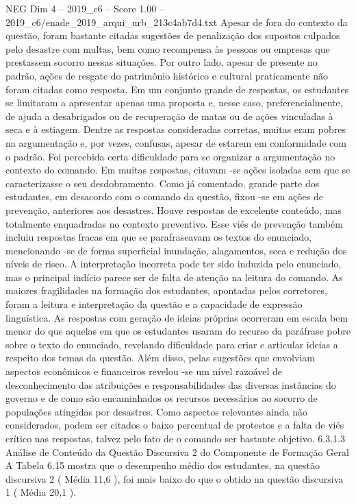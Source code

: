 \begin{textsample}{NEG Dim 4 – 2019\_c6 – Score 1.00 – 2019\_c6/enade\_2019\_arqui\_urb\_213c4ab7d4.txt}
Apesar de fora do contexto da questão, foram bastante citadas sugestões de penalização dos supostos culpados pelo desastre com multas, bem como recompensa às pessoas ou empresas que prestassem socorro nessas situações.
Por outro lado, apesar de presente no padrão, ações de resgate do patrimônio histórico e cultural praticamente não foram citadas como resposta.
Em um conjunto grande de respostas, os estudantes se limitaram a apresentar apenas uma proposta e, nesse caso, preferencialmente, de ajuda a desabrigados ou de recuperação de matas ou de ações vinculadas à seca e à estiagem.
Dentre as respostas consideradas corretas, muitas eram pobres na argumentação e, por vezes, confusas, apesar de estarem em conformidade com o padrão.
Foi percebida certa dificuldade para se organizar a argumentação no contexto do comando.
Em muitas respostas, citavam -se ações isoladas sem que se caracterizasse o seu desdobramento.
Como já comentado, grande parte dos estudantes, em desacordo com o comando da questão, fixou -se em ações de prevenção, anteriores aos desastres.
Houve respostas de excelente conteúdo, mas totalmente enquadradas no contexto preventivo.
Esse viés de prevenção também incluiu respostas fracas em que se parafraseavam os textos do enunciado, mencionando -se de forma superficial inundação, alagamentos, seca e redução dos níveis de risco.
A interpretação incorreta pode ter sido induzida pelo enunciado, mas o principal indício parece ser de falta de atenção na leitura do comando.
As maiores fragilidades na formação dos estudantes, apontadas pelos corretores, foram a leitura e interpretação da questão e a capacidade de expressão linguística.
As respostas com geração de ideias próprias ocorreram em escala bem menor do que aquelas em que os estudantes usaram do recurso da paráfrase pobre sobre o texto do enunciado, revelando dificuldade para criar e articular ideias a respeito dos temas da questão.
Além disso, pelas sugestões que envolviam aspectos econômicos e financeiros revelou -se um nível razoável de desconhecimento das atribuições e responsabilidades das diversas instâncias do governo e de como são encaminhados os recursos necessários ao socorro de populações atingidas por desastres.
Como aspectos relevantes ainda não considerados, podem ser citados o baixo percentual de protestos e a falta de viés crítico nas respostas, talvez pelo fato de o comando ser bastante objetivo. 6.3.1.3 Análise de Conteúdo da Questão Discursiva 2 do Componente de Formação Geral A Tabela 6.15 mostra que o desempenho médio dos estudantes, na questão discursiva 2 ( Média 11,6 ), foi mais baixo do que o obtido na questão discursiva 1 ( Média 20,1 ).

\end{textsample}
